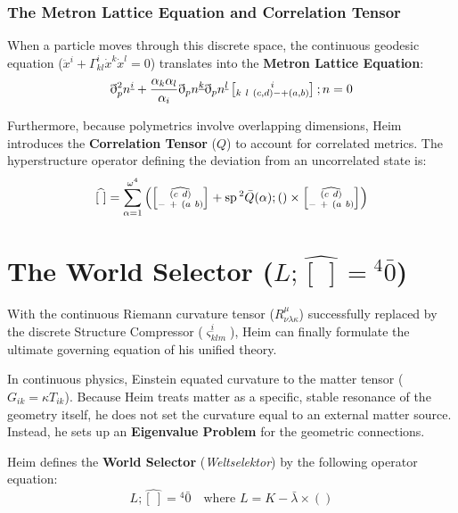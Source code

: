 \documentclass[11pt,a4paper,oneside]{article}
\newcommand{\ethop}{\eth}
\newcommand{\metroncap}[4][]{%
    \left[ \renewcommand{\arraystretch}{0.85} \substack{#2 \\ #3 \ #4} \right]_{#1}%
}
\begin{document}
\subsubsection{The Metron Lattice Equation and Correlation Tensor}
When a particle moves through this discrete space, the continuous geodesic equation ($\ddot{x}^i + \Gamma^i_{kl}\dot{x}^k\dot{x}^l = 0$) translates into the \textbf{Metron Lattice Equation}:
\begin{equation}
    \ethop^2_p n^{\underline{i}} + \frac{\alpha_k \alpha_l}{\alpha_i} \ethop_p n^{\underline{k}} \ethop_p n^{\underline{l}} \metroncap{i}{k\ l}{(c,d) - + (a,b)}; n = 0
\end{equation}

Furthermore, because polymetrics involve overlapping dimensions, Heim introduces the \textbf{Correlation Tensor} ($Q$) to account for correlated metrics. The hyperstructure operator defining the deviation from an uncorrelated state is:
\begin{equation}
    \widehat{[\ ]} = \sum_{\alpha=1}^{\omega^4} \left( \metroncap{\widehat{(c\ d)}}{-\ +}{(a\ b)} + \operatorname{sp} {}^2\bar{Q}(\alpha); () \times \metroncap{\widehat{(c\ d)}}{-\ +}{(a\ b)} \right)
\end{equation}
\section{The World Selector (\texorpdfstring{$L;\widehat{[\ ]} = {}^4\bar{0}$}{L;[] = 0})}

With the continuous Riemann curvature tensor ($R^\mu_{\nu\lambda\kappa}$) successfully replaced by the discrete Structure Compressor ($\varsigma^{\underline{i}}_{klm}$), Heim can finally formulate the ultimate governing equation of his unified theory.

In continuous physics, Einstein equated curvature to the matter tensor ($G_{ik} = \kappa T_{ik}$). Because Heim treats matter as a specific, stable resonance of the geometry itself, he does not set the curvature equal to an external matter source. Instead, he sets up an \textbf{Eigenvalue Problem} for the geometric connections.

Heim defines the \textbf{World Selector} (\textit{Weltselektor}) by the following operator equation:
\begin{equation}
    L;\widehat{[\ ]} = {}^4\bar{0} \quad \text{where } L = K - \bar{\lambda} \times ()
\end{equation}
\end{document}
